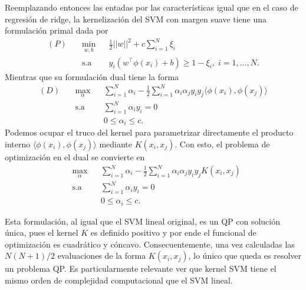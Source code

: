 Reemplazando entonces las entadas por las características igual que en el caso de regresión de ridge, la kernelización del SVM con margen suave tiene una formulación primal dada por
\begin{equation}
\begin{aligned}
(P)\quad & \underset{w,b}{\text{min}}
& & \frac{1}{2}||w||^2 + c\sum\limits_{i=1}^{N} \xi_i\\
& \text{s.a}
& & y_i (w^\top \phi(x_i) +b) \geq 1- \xi_i, \; i = 1, \ldots, N.
\end{aligned}
\end{equation}
Mientras que su formulación dual tiene la forma
\begin{equation}
\begin{aligned}
(D)\quad & \underset{\alpha}{\text{max}}
& & \sum\limits_{i=1}^{N}\alpha_i - \frac{1}{2} \sum\limits_{i=1}^{N} \alpha_i \alpha_j y_i y_j \langle\phi(x_i), \phi(x_j)\rangle\\
& \text{s.a}
& & \sum\limits_{i=1}^{N} \alpha_i y_i= 0 \\
& &  &0 \leq \alpha_i \leq c.
\end{aligned}
\end{equation}
Podemos ocupar el truco del kernel para parametrizar directamente el producto interno $\langle \phi(x_i), \phi(x_j)\rangle$ mediante $K(x_i,x_j)$. Con esto, el problema de optimización en el dual se convierte en 
\begin{equation}
\begin{aligned}
& \underset{\alpha}{\text{max}}
& & \sum\limits_{i=1}^{N}\alpha_i - \frac{1}{2} \sum\limits_{i=1}^{N} \alpha_i \alpha_j y_i y_j K(x_i, x_j)\\
& \text{s.a}
& & \sum\limits_{i=1}^{N} \alpha_i y_i= 0 \\
& &  &0 \leq \alpha_i \leq c.
\end{aligned}
\end{equation}

\begin{remark}
Esta formulación, al igual que el SVM lineal original, es un QP  con solución única, pues  el kernel $K$ es definido positivo y por ende el funcional de optimización es cuadrático y cóncavo. Consecuentemente, una vez calculadas las $N(N+1)/2$ evaluaciones de la forma $K(x_i, x_j)$, lo único que queda es resolver un problema QP.  Es particularmente relevante ver que kernel SVM tiene el mismo orden de complejidad computacional que el SVM lineal.
\end{remark}

